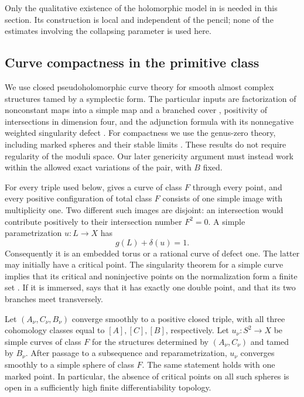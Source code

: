 Only the qualitative existence of the holomorphic model in
 is needed in this section.  Its construction is
local and independent of the pencil; none of the estimates involving
the collapsing parameter is used here.

\subsection{Curve compactness in the primitive class}

We use closed pseudoholomorphic curve theory for smooth almost complex
structures tamed by a symplectic form.  The particular inputs are
factorization of nonconstant maps into a simple map and a branched
cover \cite[Proposition~2.5.1]{McDuffSalamon2012}, positivity of
intersections in dimension four, and the adjunction formula with its
nonnegative weighted singularity defect
\cite[Theorem~2.3, Corollary~2.4, and Theorem~2.8]{Wendl2020}.
For compactness we use the genus-zero theory, including marked spheres
and their stable limits
\cite[Theorems~5.3.1 and~5.5.5]{McDuffSalamon2012}.
These results do not require regularity of the moduli space.  Our later
genericity argument must instead work within the allowed exact
variations of the pair, with $B$ fixed.

For every triple used below,  gives a curve of
class $F$ through every point, and every positive configuration of total
class $F$ consists of one simple image with multiplicity one.  Two
different such images are disjoint: an intersection would contribute
positively to their intersection number $F^2=0$.  A simple
parametrization $u:L\to X$ has
\begin{equation}\label{eq:pencil-adjunction}
 g(L)+\delta(u)=1.
\end{equation}
Consequently it is an embedded torus or a rational curve of defect one.
The latter may initially have a critical point.  The singularity
theorem for a simple curve implies that its critical and noninjective
points on the normalization form a finite set
\cite[Propositions~B.26 and~B.41 and Theorem~2.3]{Wendl2020}.
If it is immersed,
 says that it has exactly one double point,
and that its two branches meet transversely.

\begin{lemma}\label{lem:pencil-compactness}
Let $(A_\nu,C_\nu,B_\nu)$ converge smoothly to a positive closed triple,
with all three cohomology classes equal to $[A],[C],[B]$, respectively.
Let $u_\nu:S^2\to X$ be simple curves of class $F$ for the structures
determined by $(A_\nu,C_\nu)$ and tamed by $B_\nu$.  After passage to a
subsequence and reparametrization, $u_\nu$ converges smoothly to a simple
sphere of class $F$.  The same statement holds with one marked point.
In particular, the absence of critical points on all such spheres is
open in a sufficiently high finite differentiability topology.
\end{lemma}

